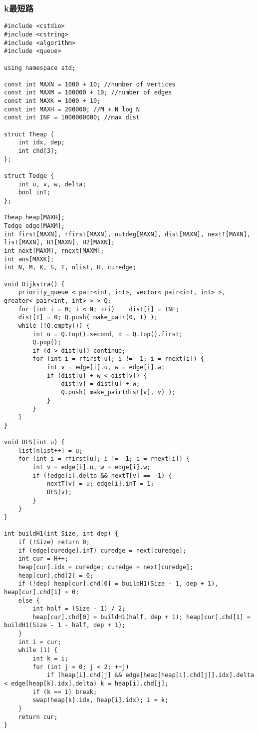 \subsubsection{k最短路}
\begin{verbatim}
#include <cstdio>
#include <cstring>
#include <algorithm>
#include <queue>

using namespace std;

const int MAXN = 1000 + 10; //number of vertices
const int MAXM = 100000 + 10; //number of edges
const int MAXK = 1000 + 10;
const int MAXH = 200000; //M + N log N
const int INF = 1000000000; //max dist

struct Theap {
    int idx, dep;
    int chd[3];
};

struct Tedge {
    int u, v, w, delta;
    bool inT;
};

Theap heap[MAXH];
Tedge edge[MAXM];
int first[MAXN], rfirst[MAXN], outdeg[MAXN], dist[MAXN], nextT[MAXN], list[MAXN], H1[MAXN], H2[MAXN];
int next[MAXM], rnext[MAXM];
int ans[MAXK];
int N, M, K, S, T, nlist, H, curedge;

void Dijkstra() {
    priority_queue < pair<int, int>, vector< pair<int, int> >, greater< pair<int, int> > > Q;
    for (int i = 0; i < N; ++i)    dist[i] = INF;
    dist[T] = 0; Q.push( make_pair(0, T) );
    while (!Q.empty()) {
        int u = Q.top().second, d = Q.top().first;
        Q.pop();
        if (d > dist[u]) continue;
        for (int i = rfirst[u]; i != -1; i = rnext[i]) {
            int v = edge[i].u, w = edge[i].w;
            if (dist[u] + w < dist[v]) {
                dist[v] = dist[u] + w;
                Q.push( make_pair(dist[v], v) );
            }
        }
    }
}

void DFS(int u) {
    list[nlist++] = u;
    for (int i = rfirst[u]; i != -1; i = rnext[i]) {
        int v = edge[i].u, w = edge[i].w;
        if (!edge[i].delta && nextT[v] == -1) {
            nextT[v] = u; edge[i].inT = 1;
            DFS(v);
        }
    }
}

int buildH1(int Size, int dep) {
    if (!Size) return 0;
    if (edge[curedge].inT) curedge = next[curedge];
    int cur = H++;
    heap[cur].idx = curedge; curedge = next[curedge];
    heap[cur].chd[2] = 0;
    if (!dep) heap[cur].chd[0] = buildH1(Size - 1, dep + 1), heap[cur].chd[1] = 0;
    else {
        int half = (Size - 1) / 2;
        heap[cur].chd[0] = buildH1(half, dep + 1); heap[cur].chd[1] = buildH1(Size - 1 - half, dep + 1);
    }
    int i = cur;
    while (1) {
        int k = i;
        for (int j = 0; j < 2; ++j)
            if (heap[i].chd[j] && edge[heap[heap[i].chd[j]].idx].delta < edge[heap[k].idx].delta) k = heap[i].chd[j];
        if (k == i) break;
        swap(heap[k].idx, heap[i].idx); i = k;
    }
    return cur;
}


\end{verbatim}
